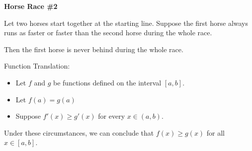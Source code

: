 \documentclass{ximera}
\begin{document}
\begin{idea} \textbf{\textcolor{blue!55!black}{Horse Race \#2}}   


Let two horses start together at the starting line. Suppose the first horse always runs as faster or faster than the second horse during the whole race.

Then the first horse is never behind during the whole race.



\begin{model} Function Translation:

\begin{itemize}
\item Let $f$ and $g$ be functions defined on the interval $[a, b]$. 
\item Let $f(a) = g(a)$
\item Suppose $f'(x) \geq g'(x)$ for every $x \in (a,b)$. 
\end{itemize}

Under these circumstances, we can conclude that $f(x) \geq g(x)$ for all $x \in [a,b]$.

\end{model}

\end{idea}
\end{document}
